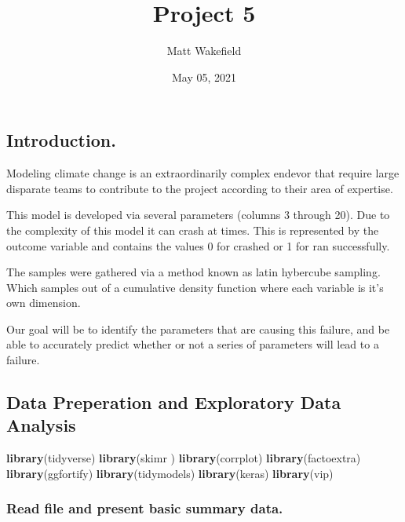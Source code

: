 \documentclass[
  11pt,
]{article}
\title{Project 5}
\author{Matt Wakefield}
\date{May 05, 2021}
\newenvironment{Shaded}{\begin{snugshade}}{\end{snugshade}}
\newcommand{\KeywordTok}[1]{\textcolor[rgb]{0.13,0.29,0.53}{\textbf{#1}}}
\newcommand{\NormalTok}[1]{#1}
\begin{document}
\maketitle

{
\setcounter{tocdepth}{4}
\tableofcontents
}
\hypertarget{introduction.}{%
\subsection{Introduction.}\label{introduction.}}

Modeling climate change is an extraordinarily complex endevor that
require large disparate teams to contribute to the project according to
their area of expertise.

This model is developed via several parameters (columns 3 through 20).
Due to the complexity of this model it can crash at times. This is
represented by the outcome variable and contains the values 0 for
crashed or 1 for ran successfully.

The samples were gathered via a method known as latin hybercube
sampling. Which samples out of a cumulative density function where each
variable is it's own dimension.

Our goal will be to identify the parameters that are causing this
failure, and be able to accurately predict whether or not a series of
parameters will lead to a failure.

\hypertarget{data-preperation-and-exploratory-data-analysis}{%
\subsection{Data Preperation and Exploratory Data
Analysis}\label{data-preperation-and-exploratory-data-analysis}}

\begin{Shaded}
\begin{Highlighting}[]
\KeywordTok{library}\NormalTok{(tidyverse)}
\KeywordTok{library}\NormalTok{(skimr )}
\KeywordTok{library}\NormalTok{(corrplot)}
\KeywordTok{library}\NormalTok{(factoextra)}
\KeywordTok{library}\NormalTok{(ggfortify)}
\KeywordTok{library}\NormalTok{(tidymodels)}
\KeywordTok{library}\NormalTok{(keras)}
\KeywordTok{library}\NormalTok{(vip)}
\end{Highlighting}
\end{Shaded}

\hypertarget{read-file-and-present-basic-summary-data.}{%
\subsubsection{Read file and present basic summary
data.}\label{read-file-and-present-basic-summary-data.}}
\end{document}
